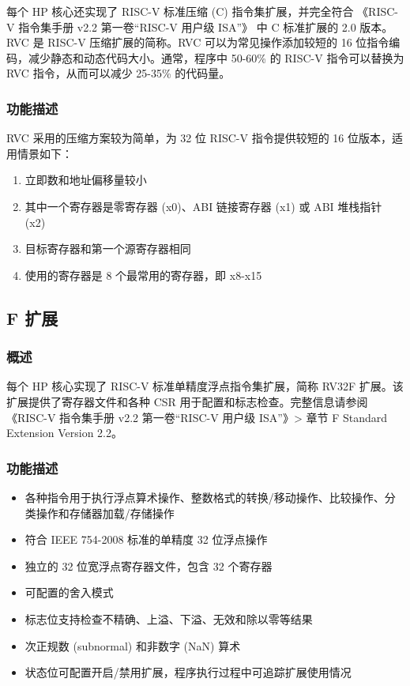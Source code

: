 \documentclass[main\_\_CN.tex]{subfiles}
\begin{document}
\label{sec:riscvcpu-cext-overview}

每个 HP 核心还实现了 RISC-V 标准压缩 (C) 指令集扩展，并完全符合 《RISC-V 指令集手册 v2.2 第一卷“RISC-V 用户级 ISA”》 中 C 标准扩展的 2.0 版本。RVC 是 RISC-V 压缩扩展的简称。RVC 可以为常见操作添加较短的 16 位指令编码，减少静态和动态代码大小。通常，程序中 50-60\% 的 RISC-V 指令可以替换为 RVC 指令，从而可以减少 25-35\% 的代码量。

\subsubsection{功能描述}
\label{sec:riscvcpu-cext-func-descr}
RVC 采用的压缩方案较为简单，为 32 位 RISC-V 指令提供较短的 16 位版本，适用情景如下：
\begin{enumerate}
    \item 立即数和地址偏移量较小
    \item 其中一个寄存器是零寄存器 (x0)、ABI 链接寄存器 (x1) 或 ABI 堆栈指针 (x2)
    \item 目标寄存器和第一个源寄存器相同
    \item 使用的寄存器是 8 个最常用的寄存器，即 x8-x15
\end{enumerate}

\newpage

\subsection{F 扩展}
\label{sec:riscvcpu-fpu}

\subsubsection{概述}
\label{sec:riscvcpu-fpu-overview}

每个 HP 核心实现了 RISC-V 标准单精度浮点指令集扩展，简称 RV32F 扩展。该扩展提供了寄存器文件和各种 CSR 用于配置和标志检查。完整信息请参阅《RISC-V 指令集手册 v2.2 第一卷“RISC-V 用户级 ISA”》> 章节 F Standard Extension Version 2.2。

\subsubsection{功能描述}
\label{sec:riscvcpu-fpu-func-descr}

\begin{itemize}
    \item 各种指令用于执行浮点算术操作、整数格式的转换/移动操作、比较操作、分类操作和存储器加载/存储操作
    \item 符合 IEEE 754-2008 标准的单精度 32 位浮点操作
    \item 独立的 32 位宽浮点寄存器文件，包含 32 个寄存器
    \item 可配置的舍入模式
    \item 标志位支持检查不精确、上溢、下溢、无效和除以零等结果
    \item 次正规数 (subnormal) 和非数字 (NaN) 算术
    \item 状态位可配置开启/禁用扩展，程序执行过程中可追踪扩展使用情况
\end{itemize}
\end{document}
